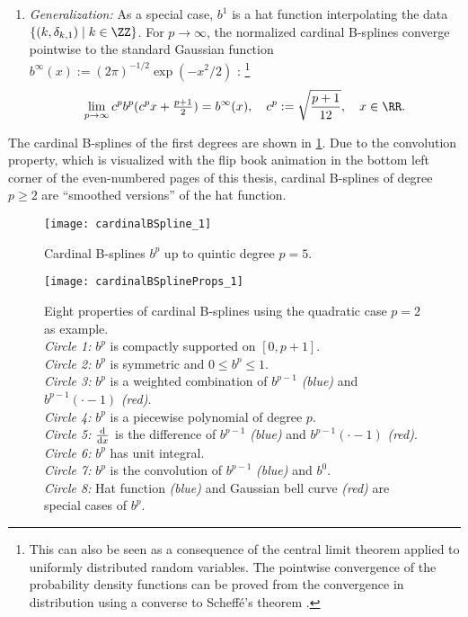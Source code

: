 \begin{enumerate}
  \item
  \emph{Generalization:}
  As a special case, $b^1$ is a hat function interpolating the data
  $\{(k, \delta_{k,1}) \mid k \in \ZZ\}$.
  For $p \to \infty$, the normalized cardinal B-splines converge
  pointwise to the standard Gaussian function
  $b^\infty(x) := (2\pi)^{-1/2} \exp(-x^2/2)$ \cite{Unser92Asymptotic}:%
  \footnote{%
    This can also be seen as a consequence of the central limit theorem
    applied to uniformly distributed random variables.
    The pointwise convergence of the probability density functions
    can be proved from the convergence
    in distribution using a converse to Scheffé's theorem
    \cite{Boos85Converse}.%
  }
  \begin{equation}
    \lim_{p \to \infty}
    c^p b^p(c^p x + \tfrac{p+1}{2})
    = b^\infty(x),\quad
    c^p := \sqrt{\frac{p+1}{12}},\quad
    x \in \RR.
  \end{equation}
\end{enumerate}
The cardinal B-splines of the first degrees are shown in
\cref{fig:cardinalBSpline}.
Due to the convolution property,
which is visualized with the flip book animation in the bottom left corner
of the even-numbered pages of this thesis,
cardinal B-splines of degree $p \ge 2$ are ``smoothed versions''
of the hat function.

\begin{figure}
  \texttt{[image: cardinalBSpline\_1]}%
  \caption{Cardinal B-splines $b^p$ up to quintic degree $p = 5$.}%
  \label{fig:cardinalBSpline}
\end{figure}

\begin{figure}
  \texttt{[image: cardinalBSplineProps\_1]}%
  \caption{%
    Eight properties of cardinal B-splines using the quadratic case
    $p = 2$ as example.\\
    \emph{Circle 1:} $b^p$ is compactly supported on $[0, p+1]$.\\
    \emph{Circle 2:} $b^p$ is symmetric and $0 \le b^p \le 1$.\\
    \emph{Circle 3:} $b^p$ is a weighted combination of
    $b^{p-1}$ \emph{\textcolor{C0}{(blue)}} and
    $b^{p-1}({\cdot} - 1)$ \emph{\textcolor{C1}{(red)}}.\\
    \emph{Circle 4:} $b^p$ is a piecewise polynomial of degree $p$.\\
    \emph{Circle 5:} $\frac{\mathop{}\!\mathrm{d}}{\mathop{}\!\mathrm{d}{}x}$ is the difference of
    $b^{p-1}$ \emph{\textcolor{C0}{(blue)}} and
    $b^{p-1}({\cdot} - 1)$ \emph{\textcolor{C1}{(red)}}.\\
    \emph{Circle 6:} $b^p$ has unit integral.\\
    \emph{Circle 7:} $b^p$ is the convolution of
    $b^{p-1}$ \emph{\textcolor{C0}{(blue)}} and $b^0$.\\
    \emph{Circle 8:} Hat function \emph{\textcolor{C0}{(blue)}} and
    Gaussian bell curve \emph{\textcolor{C1}{(red)}} are special cases
    of $b^p$.%
  }%
  \label{fig:cardinalBSplineProps}
\end{figure}


